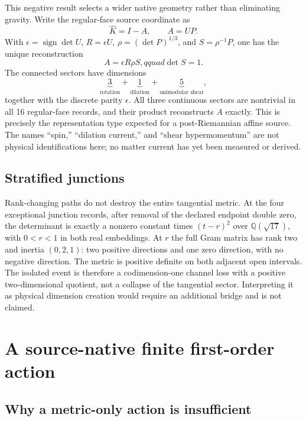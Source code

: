 This negative result selects a wider native geometry rather than eliminating gravity. Write the regular-face source coordinate as
\begin{equation}\label{eq:polar}
 \widehat K=I-A,\qquad A=UP.
\end{equation}
With $\epsilon=\operatorname{sign}\det U$, $R=\epsilon U$, $\rho=(\det P)^{1/3}$, and $S=\rho^{-1}P$, one has the unique reconstruction
\begin{equation}\label{eq:hypermomentum}
 A=\epsilon R\rho S,qquad \det S=1.
\end{equation}
The connected sectors have dimensions
\begin{equation}\label{eq:315}
 \underbrace{3}_{\text{rotation}}
 +\underbrace{1}_{\text{dilation}}
 +\underbrace{5}_{\text{unimodular shear}},
\end{equation}
together with the discrete parity $\epsilon$. All three continuous sectors are nontrivial in all 16 regular-face records, and their product reconstructs $A$ exactly. This is precisely the representation type expected for a post-Riemannian affine source. The names ``spin,'' ``dilation current,'' and ``shear hypermomentum'' are not physical identifications here; no matter current has yet been measured or derived.

\subsection{Stratified junctions}

Rank-changing paths do not destroy the entire tangential metric. At the four exceptional junction records, after removal of the declared endpoint double zero, the determinant is exactly a nonzero constant times $(t-r)^2$ over $\mathbb Q(\sqrt{17})$, with $0<r<1$ in both real embeddings. At $r$ the full Gram matrix has rank two and inertia $(0,2,1)$: two positive directions and one zero direction, with no negative direction. The metric is positive definite on both adjacent open intervals. The isolated event is therefore a codimension-one channel loss with a positive two-dimensional quotient, not a collapse of the tangential sector. Interpreting it as physical dimension creation would require an additional bridge and is not claimed.

\section{A source-native finite first-order action}

\subsection{Why a metric-only action is insufficient}

